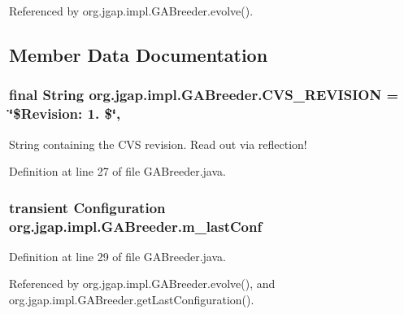 Referenced by org.\-jgap.\-impl.\-G\-A\-Breeder.\-evolve().



\subsection{Member Data Documentation}
\hypertarget{classorg_1_1jgap_1_1impl_1_1_g_a_breeder_a456d8e9b7844c837732400b8e8845665}{
\subsubsection[{C\-V\-S\-\_\-\-R\-E\-V\-I\-S\-I\-O\-N}]{\setlength{\rightskip}{0pt plus 5cm}final String org.\-jgap.\-impl.\-G\-A\-Breeder.\-C\-V\-S\-\_\-\-R\-E\-V\-I\-S\-I\-O\-N = \char`\"{}\$Revision\-: 1. \$\char`\"{}\hspace{0.3cm}{\ttfamily [static]}, {\ttfamily [private]}}}\label{classorg_1_1jgap_1_1impl_1_1_g_a_breeder_a456d8e9b7844c837732400b8e8845665}
String containing the C\-V\-S revision. Read out via reflection! 

Definition at line 27 of file G\-A\-Breeder.\-java.

\hypertarget{classorg_1_1jgap_1_1impl_1_1_g_a_breeder_a4c1a6917df25082bb61c7d9408cdde6a}{
\subsubsection[{m\-\_\-last\-Conf}]{\setlength{\rightskip}{0pt plus 5cm}transient {\bf Configuration} org.\-jgap.\-impl.\-G\-A\-Breeder.\-m\-\_\-last\-Conf\hspace{0.3cm}{\ttfamily [private]}}}\label{classorg_1_1jgap_1_1impl_1_1_g_a_breeder_a4c1a6917df25082bb61c7d9408cdde6a}


Definition at line 29 of file G\-A\-Breeder.\-java.



Referenced by org.\-jgap.\-impl.\-G\-A\-Breeder.\-evolve(), and org.\-jgap.\-impl.\-G\-A\-Breeder.\-get\-Last\-Configuration().

